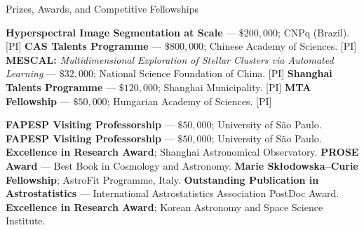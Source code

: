 \begin{rubric}{Prizes, Awards, and Competitive Fellowships}


\entry*[2025 -- 2029]
\textbf{Hyperspectral Image Segmentation at Scale} — $\$200{,}000$; CNPq (Brazil). [PI]
%
\entry*[2021 -- 2023]
\textbf{CAS Talents Programme} — $\$800{,}000$; Chinese Academy of Sciences. [PI]
%
\entry*[2021 -- 2023]
\textbf{MESCAL:} \textit{Multidimensional Exploration of Stellar Clusters via Automated Learning} — $\$32{,}000$; National Science Foundation of China. [PI]
%
\entry*[2017 -- 2020]
\textbf{Shanghai Talents Programme} — $\$120{,}000$; Shanghai Municipality. [PI]
%
\entry*[2014 -- 2016]
\textbf{MTA Fellowship} — $\$50{,}000$; Hungarian Academy of Sciences. [PI]

%
\entry*[2024 -- 2025]
\textbf{FAPESP Visiting Professorship} — $\$50{,}000$; University of São Paulo.
%
\entry*[2016 -- 2017]
\textbf{FAPESP Visiting Professorship} — $\$50{,}000$; University of São Paulo.
%
\entry*[2022]
\textbf{Excellence in Research Award}; Shanghai Astronomical Observatory.
%
\entry*[2018]
\textbf{PROSE Award} — Best Book in Cosmology and Astronomy.
%
\entry*[2017]
\textbf{Marie Skłodowska--Curie Fellowship}; AstroFit Programme, Italy.
%
\entry*[2016]
\textbf{Outstanding Publication in Astrostatistics} — International Astrostatistics Association PostDoc Award.
%
\entry*[2014]
\textbf{Excellence in Research Award}; Korean Astronomy and Space Science Institute.

\end{rubric}

